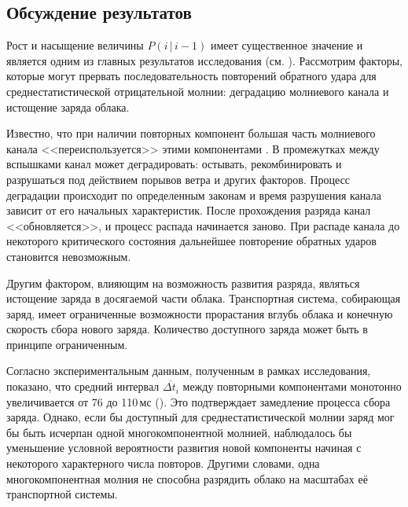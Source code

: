 \subsection{Обсуждение результатов}
Рост и насыщение величины $P(i\,|\,i-1)$ имеет существенное значение и является одним из главных результатов исследования (см. ). Рассмотрим факторы, которые могут прервать последовательность повторений обратного удара для среднестатистической отрицательной молнии: деградацию молниевого канала и истощение заряда облака.

Известно, что при наличии повторных компонент большая часть молниевого канала <<переиспользуется>> этими компонентами \cite{Rakov-PhysicsOfLightning}. В промежутках между вспышками канал может деградировать: остывать, рекомбинировать и разрушаться под действием порывов ветра и других факторов. Процесс деградации происходит по определенным законам и время разрушения канала зависит от его начальных характеристик. После прохождения разряда канал <<обновляется>>, и процесс распада начинается заново. При распаде канала до некоторого критического состояния дальнейшее повторение обратных ударов становится невозможным.


Другим фактором, влияющим на возможность развития разряда, являться истощение заряда в досягаемой части облака. Транспортная система, собирающая заряд, имеет ограниченные возможности прорастания вглубь облака и конечную скорость сбора нового заряда. Количество доступного заряда может быть в принципе ограниченным.

Согласно экспериментальным данным, полученным в рамках исследования, показано, что средний интервал $\overline {\Delta t_i}$ между повторными компонентами монотонно увеличивается от 76 до 110\,мс (). Это подтверждает замедление процесса сбора заряда. Однако, если бы доступный для среднестатистической молнии заряд мог бы быть исчерпан одной многокомпонентной молнией, наблюдалось бы уменьшение условной вероятности развития новой компоненты начиная с некоторого характерного числа повторов. Другими словами, одна многокомпонентная молния не способна разрядить облако на масштабах её транспортной системы.

